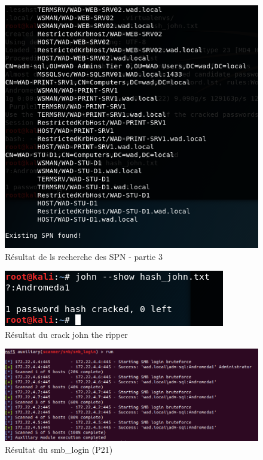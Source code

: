 \documentclass[12pt]{report} %
\begin{document}
\begin{figure}[!h]
	\includegraphics[width=17cm]{SPN_command_c.PNG}
	\caption*{Résultat de ls recherche des SPN - partie 3}
\end{figure}

\begin{figure}[!h]
	\includegraphics[]{password_john_cracked.PNG}
	\caption*{Résultat du crack john the ripper}
\end{figure}

\begin{figure}[!h]
	\includegraphics[width=17cm]{P21.PNG}
	\caption*{Résultat du smb\_login (P21)}
\end{figure}
\end{document}

